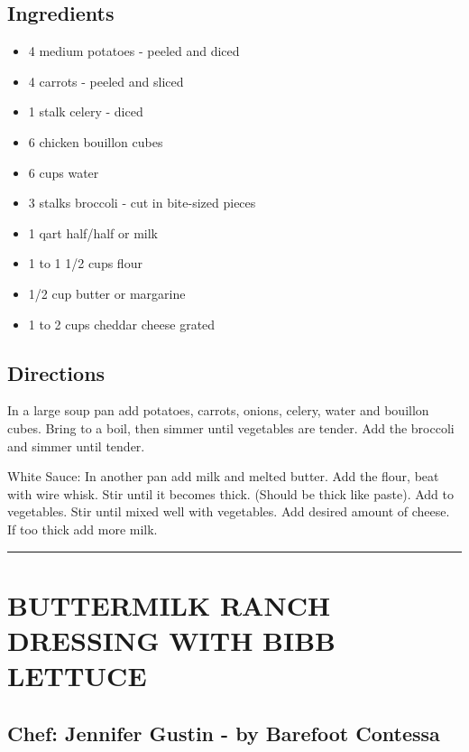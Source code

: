 \documentclass[
]{book}
\providecommand{\tightlist}{%
  \setlength{\itemsep}{0pt}\setlength{\parskip}{0pt}}
\begin{document}
\hypertarget{ingredients-15}{%
\subsection*{Ingredients}\label{ingredients-15}}


\begin{itemize}
\tightlist
\item
  4 medium potatoes - peeled and diced
\item
  4 carrots - peeled and sliced
\item
  1 stalk celery - diced
\item
  6 chicken bouillon cubes
\item
  6 cups water
\item
  3 stalks broccoli - cut in bite-sized pieces
\item
  1 qart half/half or milk
\item
  1 to 1 1/2 cups flour
\item
  1/2 cup butter or margarine
\item
  1 to 2 cups cheddar cheese grated
\end{itemize}

\hypertarget{directions-15}{%
\subsection*{Directions}\label{directions-15}}


In a large soup pan add potatoes, carrots, onions, celery, water and bouillon cubes. Bring to a boil, then simmer until vegetables are tender. Add the broccoli and simmer until tender.

White Sauce:
In another pan add milk and melted butter. Add the flour, beat with wire whisk. Stir until it becomes thick. (Should be thick like paste). Add to vegetables. Stir until mixed well with vegetables. Add desired amount of cheese. If too thick add more milk.

\begin{center}\rule{0.5\linewidth}{0.5pt}\end{center}

\hypertarget{buttermilk-ranch-dressing-with-bibb-lettuce}{%
\section*{BUTTERMILK RANCH DRESSING WITH BIBB LETTUCE}\label{buttermilk-ranch-dressing-with-bibb-lettuce}}


\hypertarget{chef-jennifer-gustin---by-barefoot-contessa}{%
\subsection*{Chef: Jennifer Gustin - by Barefoot Contessa}\label{chef-jennifer-gustin---by-barefoot-contessa}}
\end{document}
